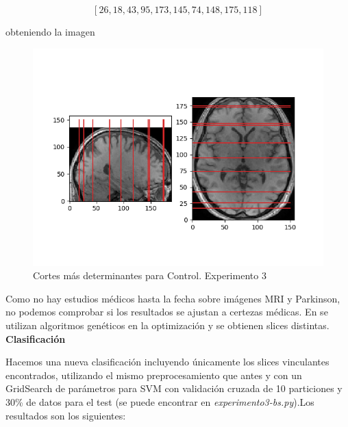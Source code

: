 $$[26, 18, 43, 95, 173, 145, 74, 148, 175, 118]$$

obteniendo la imagen

\begin{figure}[H] %
	\centering
	\includegraphics[scale=0.8]{cortes-C-exp3.png}  %
	\caption{Cortes más determinantes para Control. Experimento 3} 
	\label{fig:cortes-C-exp3}
\end{figure}

Como no hay estudios médicos hasta la fecha sobre imágenes MRI y Parkinson, no podemos comprobar si los resultados se ajustan a certezas médicas. En \cite{alberto} se utilizan algoritmos genéticos en la optimización y se obtienen slices distintas. \\
\newpage
\textbf{Clasificación}

Hacemos una nueva clasificación incluyendo únicamente los slices vinculantes encontrados, utilizando el mismo preprocesamiento que antes y con un GridSearch de parámetros para SVM con validación cruzada de 10 particiones y 30\% de datos para el test (se puede encontrar en \textit{experimento3-bs.py}).Los resultados son los siguientes:


